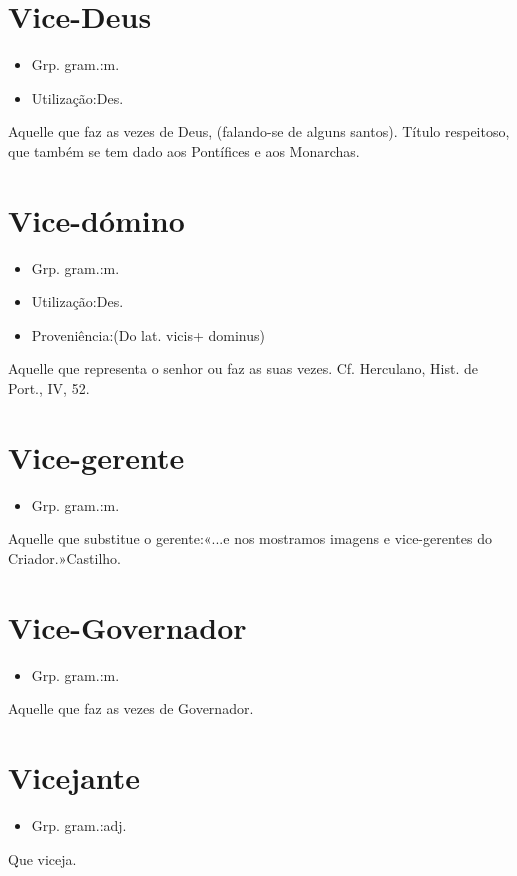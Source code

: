\documentclass{article}
\begin{document}
\section{Vice-Deus}
\begin{itemize}
\item {Grp. gram.:m.}
\end{itemize}
\begin{itemize}
\item {Utilização:Des.}
\end{itemize}
Aquelle que faz as vezes de Deus, (falando-se de alguns santos).
Título respeitoso, que também se tem dado aos Pontífices e aos Monarchas.
\section{Vice-dómino}
\begin{itemize}
\item {Grp. gram.:m.}
\end{itemize}
\begin{itemize}
\item {Utilização:Des.}
\end{itemize}
\begin{itemize}
\item {Proveniência:(Do lat. \textunderscore vicis\textunderscore  + \textunderscore dominus\textunderscore )}
\end{itemize}
Aquelle que representa o senhor ou faz as suas vezes. Cf. Herculano, \textunderscore Hist. de Port.\textunderscore , IV, 52.
\section{Vice-gerente}
\begin{itemize}
\item {Grp. gram.:m.}
\end{itemize}
Aquelle que substitue o gerente:«\textunderscore ...e nos mostramos imagens e vice-gerentes do Criador.\textunderscore »Castilho.
\section{Vice-Governador}
\begin{itemize}
\item {Grp. gram.:m.}
\end{itemize}
Aquelle que faz as vezes de Governador.
\section{Vicejante}
\begin{itemize}
\item {Grp. gram.:adj.}
\end{itemize}
Que viceja.
\end{document}
